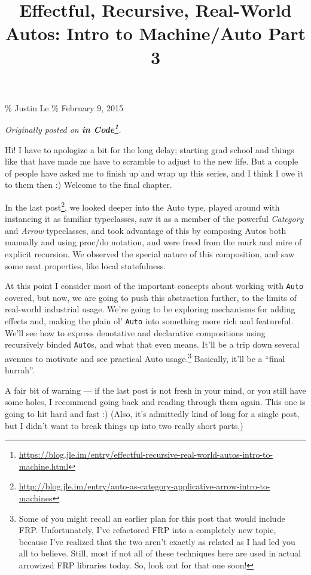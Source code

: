 \documentclass[]{article}
\title{Effectful, Recursive, Real-World Autos: Intro to Machine/Auto Part 3}
\renewcommand{\href}[2]{#2\footnote{\url{#1}}}
\begin{document}
\maketitle

\% Justin Le \% February 9, 2015

\emph{Originally posted on
\textbf{\href{https://blog.jle.im/entry/effectful-recursive-real-world-autos-intro-to-machine.html}{in
Code}}.}

Hi! I have to apologize a bit for the long delay; starting grad school and
things like that have made me have to scramble to adjust to the new life. But a
couple of people have asked me to finish up and wrap up this series, and I think
I owe it to them then :) Welcome to the final chapter.

In the
\href{http://blog.jle.im/entry/auto-as-category-applicative-arrow-intro-to-machines}{last
post}, we looked deeper into the Auto type, played around with instancing it as
familiar typeclasses, saw it as a member of the powerful \emph{Category} and
\emph{Arrow} typeclasses, and took advantage of this by composing Autos both
manually and using proc/do notation, and were freed from the murk and mire of
explicit recursion. We observed the special nature of this composition, and saw
some neat properties, like local statefulness.

At this point I consider most of the important concepts about working with
\texttt{Auto} covered, but now, we are going to push this abstraction further,
to the limits of real-world industrial usage. We're going to be exploring
mechanisms for adding effects and, making the plain ol' \texttt{Auto} into
something more rich and featureful. We'll see how to express denotative and
declarative compositions using recursively binded \texttt{Auto}s, and what that
even means. It'll be a trip down several avenues to motivate and see practical
Auto usage.\footnote{Some of you might recall an earlier plan for this post that
  would include FRP. Unfortunately, I've refactored FRP into a completely new
  topic, because I've realized that the two aren't exactly as related as I had
  led you all to believe. Still, most if not all of these techniques here are
  used in actual arrowized FRP libraries today. So, look out for that one soon!}
Basically, it'll be a ``final hurrah''.

A fair bit of warning --- if the last post is not fresh in your mind, or you
still have some holes, I recommend going back and reading through them again.
This one is going to hit hard and fast :) (Also, it's admittedly kind of long
for a single post, but I didn't want to break things up into two really short
parts.)
\end{document}
